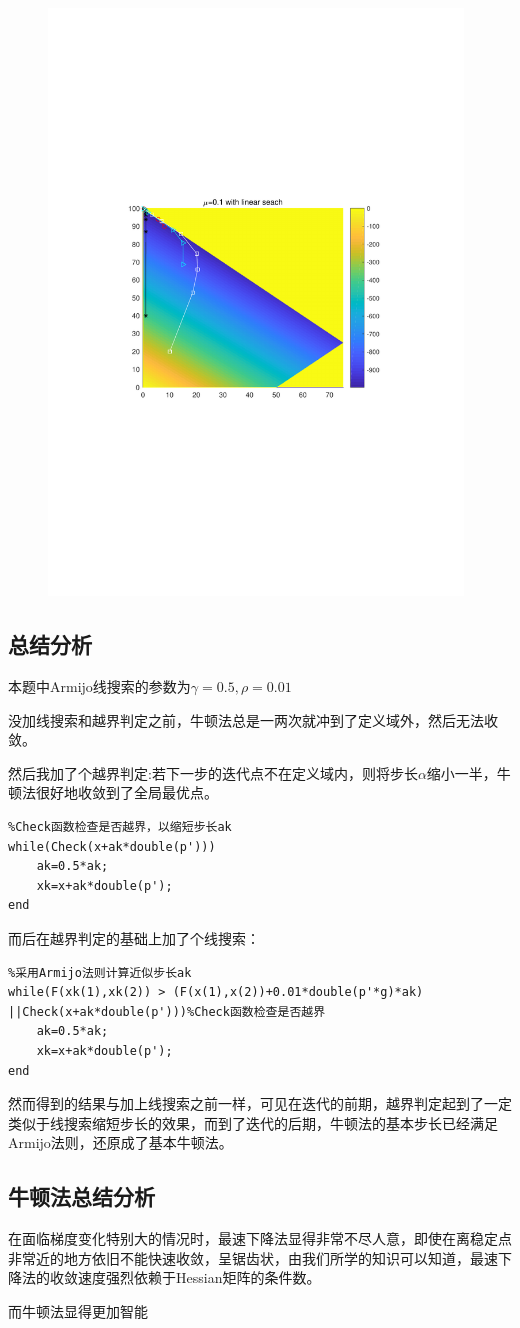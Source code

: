 \begin{figure}[H]
\centering
\includegraphics[width=11cm]{fig/5_2.pdf}
\end{figure}

\subsection{总结分析}
本题中Armijo线搜索的参数为$\gamma=0.5,\rho=0.01$

没加线搜索和越界判定之前，牛顿法总是一两次就冲到了定义域外，然后无法收敛。

然后我加了个越界判定:若下一步的迭代点不在定义域内，则将步长$\alpha$缩小一半，牛顿法很好地收敛到了全局最优点。

\begin{lstlisting}
%Check函数检查是否越界，以缩短步长ak
while(Check(x+ak*double(p')))
	ak=0.5*ak;
	xk=x+ak*double(p');
end
\end{lstlisting}

而后在越界判定的基础上加了个线搜索：

\begin{lstlisting}
%采用Armijo法则计算近似步长ak
while(F(xk(1),xk(2)) > (F(x(1),x(2))+0.01*double(p'*g)*ak)
||Check(x+ak*double(p')))%Check函数检查是否越界
	ak=0.5*ak;
	xk=x+ak*double(p');
end
\end{lstlisting}

然而得到的结果与加上线搜索之前一样，可见在迭代的前期，越界判定起到了一定类似于线搜索缩短步长的效果，而到了迭代的后期，牛顿法的基本步长已经满足Armijo法则，还原成了基本牛顿法。

\subsection{牛顿法总结分析}
在面临梯度变化特别大的情况时，最速下降法显得非常不尽人意，即使在离稳定点非常近的地方依旧不能快速收敛，呈锯齿状，由我们所学的知识可以知道，最速下降法的收敛速度强烈依赖于Hessian矩阵的条件数。

而牛顿法显得更加智能
